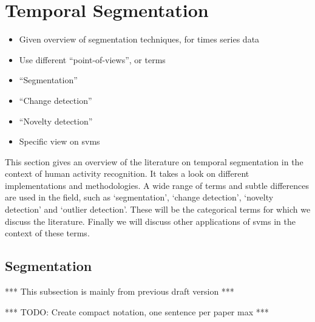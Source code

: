 \section{Temporal Segmentation}\label{sec:temporal_segmentation}

\begin{itemize}
  \item Given overview of segmentation techniques, for times series data
  \item Use different ``point-of-views'', or terms
  \item ``Segmentation''
  \item ``Change detection''
  \item ``Novelty detection''
  \item Specific view on \gls{svm}s
\end{itemize}

This section gives an overview of the literature on temporal segmentation in the context of human activity recognition.
It takes a look on different implementations and methodologies.
A wide range of terms and subtle differences are used in the field, such as `segmentation', `change detection', `novelty detection' and `outlier detection'.
These will be the categorical terms for which we discuss the literature.
Finally we will discuss other applications of \gls{svm}s in the context of these terms.

\subsection{Segmentation}\label{subsec:segmentation}
*** This subsection is mainly from previous draft version ***

*** TODO: Create compact notation, one sentence per paper max ***

